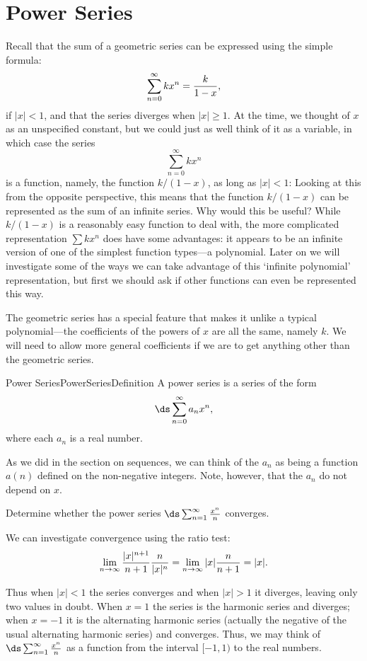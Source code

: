 \section{Power Series}\label{sec:powerseries}

Recall that the sum of a geometric series can be expressed using the simple formula:
\[\sum_{n=0}^\infty kx^n = {k\over 1-x},\]
if $|x|<1$, and that the series diverges when $|x|\ge 1$. At the time,
we thought of $x$ as an unspecified constant, but we could just as
well think of it as a variable, in which case the series
\[\sum_{n=0}^\infty kx^n\]
is a function, namely, the function $k/(1-x)$, as long as
$|x|<1$: Looking at this from the opposite perspective, this means that
the function $k/(1-x)$ can be represented as the sum of an infinite series. Why would this be useful?
While $k/(1-x)$ is a reasonably easy function to deal with,
the more complicated representation $\sum kx^n$ does have some advantages:
it appears to be an infinite version of one of the
simplest function types---a polynomial. Later on we will investigate some of the ways
we can take advantage of this `infinite polynomial' representation, but first
we should ask if other functions can even be represented this way.

The geometric series has a special feature that makes it unlike a
typical polynomial---the coefficients of the powers of $x$ are all the
same, namely $k$. We will need to allow more general coefficients if
we are to get anything other than the geometric series. 

\begin{definition}{Power Series}{PowerSeriesDefinition}
A power series is a series of the form 
$$\ds\sum_{n=0}^\infty a_nx^n,$$ 
where each $a_n$ is a real number.
\end{definition}

As we did in the section on sequences, we can think of the $a_n$ as being a function
$a(n)$ defined on the non-negative integers. Note, however, that the $a_n$ do not depend
on $x$.

\begin{example}{}{}
Determine whether the power series $\ds\sum_{n=1}^\infty {x^n\over n}$ converges.
\end{example}
\begin{solution}
We can investigate convergence using the ratio test:
\[
  \lim_{n\to\infty} {|x|^{n+1}\over n+1}{n\over |x|^n}
  =\lim_{n\to\infty} |x|{n\over n+1} =|x|.
\]

Thus when $|x|<1$ the series converges and when $|x|>1$ it diverges,
leaving only two values in doubt. When $x=1$ the series is the
harmonic series and diverges; when $x=-1$ it is the alternating
harmonic series (actually the negative of the usual alternating
harmonic series) and converges. Thus, we may think of 
$\ds\sum_{n=1}^\infty {x^n\over n}$ as a function from the interval
$[-1,1)$ to the real numbers.
\end{solution}


